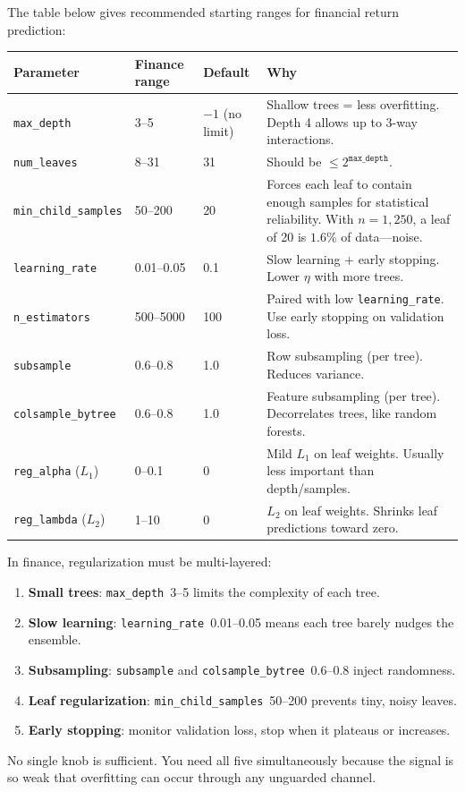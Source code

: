 The table below gives recommended starting ranges for financial return prediction:

\begin{center}
\begin{tabular}{p{4.5cm} p{2.5cm} p{2cm} p{5cm}}
\toprule
\textbf{Parameter} & \textbf{Finance range} & \textbf{Default} & \textbf{Why} \\
\midrule
\texttt{max\_depth} & 3--5 & $-1$ (no limit) & Shallow trees = less overfitting. Depth 4 allows up to 3-way interactions. \\[4pt]
\texttt{num\_leaves} & 8--31 & 31 & Should be $\leq 2^{\texttt{max\_depth}}$. \\[4pt]
\texttt{min\_child\_samples} & 50--200 & 20 & Forces each leaf to contain enough samples for statistical reliability. With $n = 1{,}250$, a leaf of 20 is $1.6\%$ of data---noise. \\[4pt]
\texttt{learning\_rate} & 0.01--0.05 & 0.1 & Slow learning + early stopping. Lower $\eta$ with more trees. \\[4pt]
\texttt{n\_estimators} & 500--5000 & 100 & Paired with low \texttt{learning\_rate}. Use early stopping on validation loss. \\[4pt]
\texttt{subsample} & 0.6--0.8 & 1.0 & Row subsampling (per tree). Reduces variance. \\[4pt]
\texttt{colsample\_bytree} & 0.6--0.8 & 1.0 & Feature subsampling (per tree). Decorrelates trees, like random forests. \\[4pt]
\texttt{reg\_alpha} ($L_1$) & 0--0.1 & 0 & Mild $L_1$ on leaf weights. Usually less important than depth/samples. \\[4pt]
\texttt{reg\_lambda} ($L_2$) & 1--10 & 0 & $L_2$ on leaf weights. Shrinks leaf predictions toward zero. \\
\bottomrule
\end{tabular}
\end{center}

\begin{keyidea}
In finance, regularization must be multi-layered:
\begin{enumerate}[nosep]
  \item \textbf{Small trees}: \texttt{max\_depth}~3--5 limits the complexity of each tree.
  \item \textbf{Slow learning}: \texttt{learning\_rate}~0.01--0.05 means each tree barely nudges the ensemble.
  \item \textbf{Subsampling}: \texttt{subsample} and \texttt{colsample\_bytree}~0.6--0.8 inject randomness.
  \item \textbf{Leaf regularization}: \texttt{min\_child\_samples}~50--200 prevents tiny, noisy leaves.
  \item \textbf{Early stopping}: monitor validation loss, stop when it plateaus or increases.
\end{enumerate}
No single knob is sufficient.
You need all five simultaneously because the signal is so weak that overfitting can occur through any unguarded channel.
\end{keyidea}

